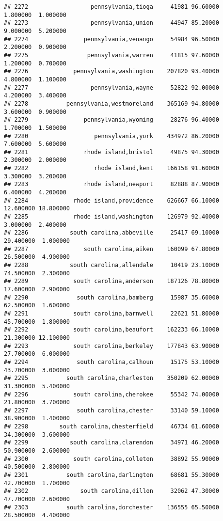 \documentclass[
]{article}
\begin{document}
\begin{verbatim}
## 2272                  pennsylvania,tioga     41981 96.60000  1.800000  1.000000
## 2273                  pennsylvania,union     44947 85.20000  9.000000  5.200000
## 2274                pennsylvania,venango     54984 96.50000  2.200000  0.900000
## 2275                 pennsylvania,warren     41815 97.60000  1.200000  0.700000
## 2276             pennsylvania,washington    207820 93.40000  4.800000  1.100000
## 2277                  pennsylvania,wayne     52822 92.00000  4.200000  3.400000
## 2278           pennsylvania,westmoreland    365169 94.80000  3.600000  0.900000
## 2279                pennsylvania,wyoming     28276 96.40000  1.700000  1.500000
## 2280                   pennsylvania,york    434972 86.20000  7.600000  5.600000
## 2281                rhode island,bristol     49875 94.30000  2.300000  2.000000
## 2282                   rhode island,kent    166158 91.60000  3.300000  3.200000
## 2283                rhode island,newport     82888 87.90000  6.400000  4.200000
## 2284             rhode island,providence    626667 66.10000 12.600000 18.800000
## 2285             rhode island,washington    126979 92.40000  3.000000  2.400000
## 2286            south carolina,abbeville     25417 69.10000 29.400000  1.000000
## 2287                south carolina,aiken    160099 67.80000 26.500000  4.900000
## 2288            south carolina,allendale     10419 23.10000 74.500000  2.300000
## 2289             south carolina,anderson    187126 78.80000 17.600000  2.900000
## 2290              south carolina,bamberg     15987 35.60000 62.500000  1.600000
## 2291             south carolina,barnwell     22621 51.80000 45.700000  1.800000
## 2292             south carolina,beaufort    162233 66.10000 21.300000 12.100000
## 2293             south carolina,berkeley    177843 63.90000 27.700000  6.000000
## 2294              south carolina,calhoun     15175 53.10000 43.700000  3.000000
## 2295           south carolina,charleston    350209 62.00000 31.300000  5.400000
## 2296             south carolina,cherokee     55342 74.00000 21.800000  3.700000
## 2297              south carolina,chester     33140 59.10000 38.900000  1.400000
## 2298         south carolina,chesterfield     46734 61.60000 34.300000  3.600000
## 2299            south carolina,clarendon     34971 46.20000 50.900000  2.600000
## 2300             south carolina,colleton     38892 55.90000 40.500000  2.800000
## 2301           south carolina,darlington     68681 55.30000 42.700000  1.700000
## 2302               south carolina,dillon     32062 47.30000 47.700000  2.600000
## 2303           south carolina,dorchester    136555 65.50000 28.500000  4.400000

\end{verbatim}
\end{document}
